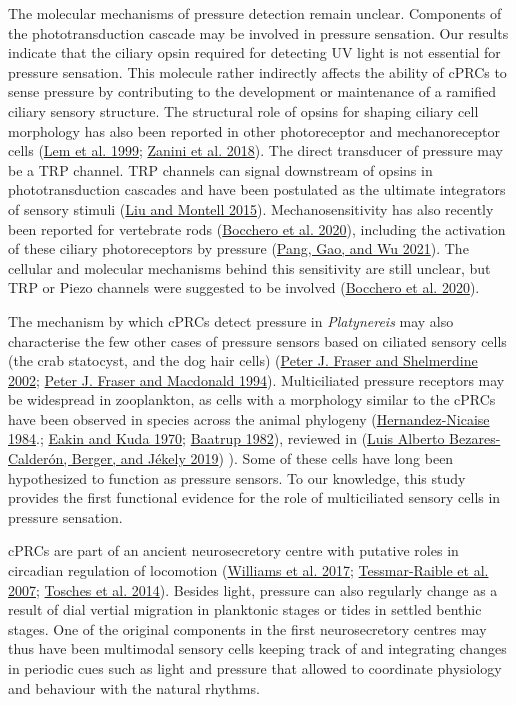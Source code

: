 \documentclass[
]{article}
\begin{document}
The molecular mechanisms of pressure detection remain unclear.
Components of the phototransduction cascade may be involved in pressure
sensation. Our results indicate that the ciliary opsin required for
detecting UV light is not essential for pressure sensation. This
molecule rather indirectly affects the ability of cPRCs to sense
pressure by contributing to the development or maintenance of a ramified
ciliary sensory structure. The structural role of opsins for shaping
ciliary cell morphology has also been reported in other photoreceptor
and mechanoreceptor cells (\protect\hyperlink{ref-lem1999}{Lem et al.
1999}; \protect\hyperlink{ref-zanini2018}{Zanini et al. 2018}). The
direct transducer of pressure may be a TRP channel. TRP channels can
signal downstream of opsins in phototransduction cascades and have been
postulated as the ultimate integrators of sensory stimuli
(\protect\hyperlink{ref-liu2015}{Liu and Montell 2015}).
Mechanosensitivity has also recently been reported for vertebrate rods
(\protect\hyperlink{ref-bocchero2020}{Bocchero et al. 2020}), including
the activation of these ciliary photoreceptors by pressure
(\protect\hyperlink{ref-pang2021}{Pang, Gao, and Wu 2021}). The cellular
and molecular mechanisms behind this sensitivity are still unclear, but
TRP or Piezo channels were suggested to be involved
(\protect\hyperlink{ref-bocchero2020}{Bocchero et al. 2020}).

The mechanism by which cPRCs detect pressure in \emph{Platynereis} may
also characterise the few other cases of pressure sensors based on
ciliated sensory cells (the crab statocyst, and the dog hair cells)
(\protect\hyperlink{ref-fraser_2002}{Peter J. Fraser and Shelmerdine
2002}; \protect\hyperlink{ref-fraser_1994}{Peter J. Fraser and Macdonald
1994}). Multiciliated pressure receptors may be widespread in
zooplankton, as cells with a morphology similar to the cPRCs have been
observed in species across the animal phylogeny
(\protect\hyperlink{ref-hernandez-nicaise1984}{Hernandez-Nicaise 1984}.;
\protect\hyperlink{ref-eakin1970}{Eakin and Kuda 1970};
\protect\hyperlink{ref-baatrup1982}{Baatrup 1982}), reviewed in
(\protect\hyperlink{ref-bezares-calderon2019}{Luis Alberto
Bezares-Calderón, Berger, and Jékely 2019}) ). Some of these cells have
long been hypothesized to function as pressure sensors. To our
knowledge, this study provides the first functional evidence for the
role of multiciliated sensory cells in pressure sensation.

cPRCs are part of an ancient neurosecretory centre with putative roles
in circadian regulation of locomotion
(\protect\hyperlink{ref-williams2017}{Williams et al. 2017};
\protect\hyperlink{ref-tessmar-raible2007}{Tessmar-Raible et al. 2007};
\protect\hyperlink{ref-tosches2014}{Tosches et al. 2014}). Besides
light, pressure can also regularly change as a result of dial vertial
migration in planktonic stages or tides in settled benthic stages. One
of the original components in the first neurosecretory centres may thus
have been multimodal sensory cells keeping track of and integrating
changes in periodic cues such as light and pressure that allowed to
coordinate physiology and behaviour with the natural rhythms.
\end{document}

